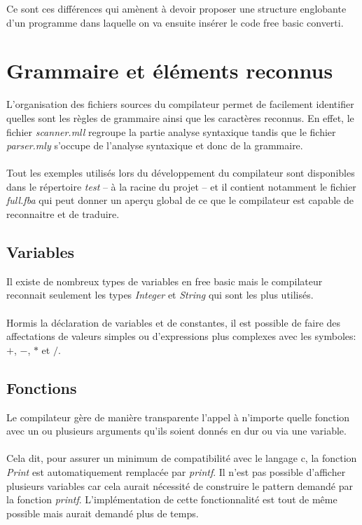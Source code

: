 \documentclass{article}
\begin{document}
\lstset{language=c,caption=Programme C englobant}


Ce sont ces différences qui amènent à devoir proposer une structure englobante d'un 
programme dans laquelle on va ensuite insérer le code free basic converti.
	
\section{Grammaire et éléments reconnus}
L'organisation des fichiers sources du compilateur permet de facilement identifier quelles sont 
les règles de grammaire ainsi que les caractères reconnus.
En effet, le fichier \emph{scanner.mll} regroupe la partie analyse syntaxique tandis que le fichier 
\emph{parser.mly} s'occupe de l'analyse syntaxique et donc de la grammaire.
\\\\
Tout les exemples utilisés lors du développement du compilateur sont disponibles dans le répertoire 
\emph{test} -- à la racine du projet -- et il contient notamment le fichier \emph{full.fba} qui peut 
donner un aperçu global de ce que le compilateur est capable de reconnaitre et de traduire.

\subsection{Variables}
Il existe de nombreux types de variables en free basic mais le compilateur reconnait seulement les types \emph{Integer}
et \emph{String} qui sont les plus utilisés. 
\\\\
Hormis la déclaration de variables et de constantes, il est possible de faire des affectations de valeurs simples
ou d'expressions plus complexes avec les symboles: $+$, $-$, $*$ et $/$.

\subsection{Fonctions}
Le compilateur gère de manière transparente l'appel à n'importe quelle fonction avec un ou plusieurs arguments
qu'ils soient donnés en dur ou via une variable.
\\\\
Cela dit, pour assurer un minimum de compatibilité avec le langage c, la fonction \emph{Print} est automatiquement
remplacée par \emph{printf}. Il n'est pas possible d'afficher plusieurs 
variables car cela aurait nécessité de construire le pattern demandé par la fonction \emph{printf}. 
L'implémentation de cette fonctionnalité est tout de même possible mais aurait demandé plus de temps.
\end{document}

